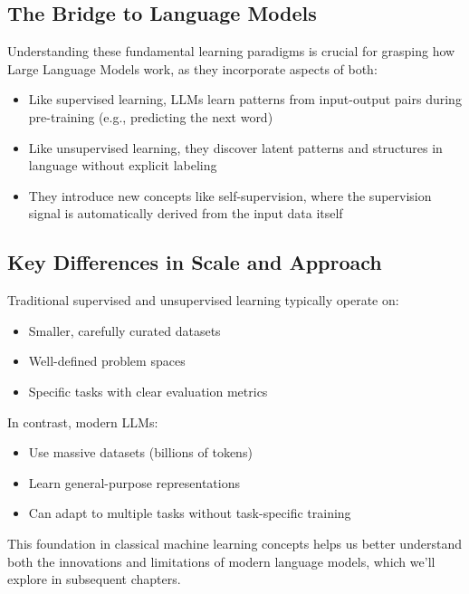 \subsection{The Bridge to Language Models}

Understanding these fundamental learning paradigms is crucial for grasping how Large Language Models work, as they incorporate aspects of both:

\begin{itemize}[noitemsep]
    \item Like supervised learning, LLMs learn patterns from input-output pairs during pre-training (e.g., predicting the next word)
    \item Like unsupervised learning, they discover latent patterns and structures in language without explicit labeling
    \item They introduce new concepts like self-supervision, where the supervision signal is automatically derived from the input data itself
\end{itemize}

\subsection{Key Differences in Scale and Approach}

Traditional supervised and unsupervised learning typically operate on:
\begin{itemize}[noitemsep]
    \item Smaller, carefully curated datasets
    \item Well-defined problem spaces
    \item Specific tasks with clear evaluation metrics
\end{itemize}

In contrast, modern LLMs:
\begin{itemize}[noitemsep]
    \item Use massive datasets (billions of tokens)
    \item Learn general-purpose representations
    \item Can adapt to multiple tasks without task-specific training
\end{itemize}

This foundation in classical machine learning concepts helps us better understand both the innovations and limitations of modern language models, which we'll explore in subsequent chapters. 